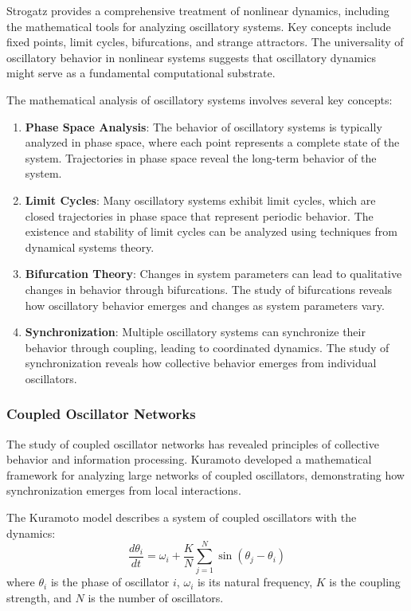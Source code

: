\documentclass[12pt,a4paper]{article}
\theoremstyle{definition}
\begin{document}
{Strogatz \cite{strogatz1994nonlinear} provides a comprehensive treatment of nonlinear dynamics, including the mathematical tools for analyzing oscillatory systems. Key concepts include fixed points, limit cycles, bifurcations, and strange attractors. The universality of oscillatory behavior in nonlinear systems suggests that oscillatory dynamics might serve as a fundamental computational substrate.

The mathematical analysis of oscillatory systems involves several key concepts:

\begin{enumerate}
\item \textbf{Phase Space Analysis}: The behavior of oscillatory systems is typically analyzed in phase space, where each point represents a complete state of the system. Trajectories in phase space reveal the long-term behavior of the system.

\item \textbf{Limit Cycles}: Many oscillatory systems exhibit limit cycles, which are closed trajectories in phase space that represent periodic behavior. The existence and stability of limit cycles can be analyzed using techniques from dynamical systems theory.

\item \textbf{Bifurcation Theory}: Changes in system parameters can lead to qualitative changes in behavior through bifurcations. The study of bifurcations reveals how oscillatory behavior emerges and changes as system parameters vary.

\item \textbf{Synchronization}: Multiple oscillatory systems can synchronize their behavior through coupling, leading to coordinated dynamics. The study of synchronization reveals how collective behavior emerges from individual oscillators.
\end{enumerate}

\subsubsection{Coupled Oscillator Networks}

The study of coupled oscillator networks has revealed principles of collective behavior and information processing. Kuramoto \cite{kuramoto1984chemical} developed a mathematical framework for analyzing large networks of coupled oscillators, demonstrating how synchronization emerges from local interactions.

The Kuramoto model describes a system of coupled oscillators with the dynamics:
\begin{equation}
\frac{d\theta_i}{dt} = \omega_i + \frac{K}{N} \sum_{j=1}^{N} \sin(\theta_j - \theta_i)
\end{equation}
where $\theta_i$ is the phase of oscillator $i$, $\omega_i$ is its natural frequency, $K$ is the coupling strength, and $N$ is the number of oscillators.

}
\end{document}
